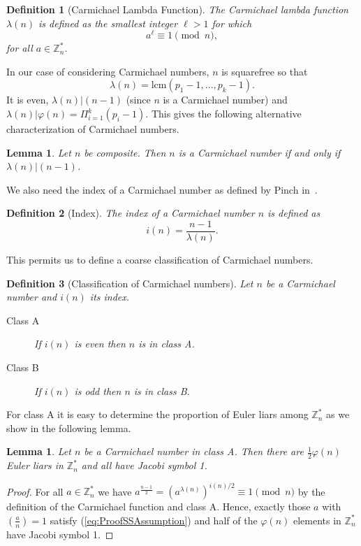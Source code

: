 \documentclass[runningheads]{amsart}
\newtheorem{lemma}[theorem]{Lemma}
\newtheorem{definition}{Definition}
\newcommand{\lcm}{\mathrm{lcm}}
\newcommand{\Z}{\mathbb{Z}}
\begin{document}
\begin{definition}[Carmichael Lambda Function]\label{def:car_lambda}
The Carmichael lambda function
$\lambda(n)$
is defined as the smallest integer
$\ell
>1$
for which
$$a^\ell
\equiv
1
\pmod
n,$$ for all $a
\in
\mathbb{Z}_n^*$.
\end{definition}
In our case of considering Carmichael numbers,
$n$ is squarefree so that
$$\lambda(n)
=
\lcm(p_1
-1,
...
,
p_k-1).$$
It is even,
$\lambda(n)|(n-1)$
(since $n$ is a Carmichael number) and
$\lambda(n)|
\varphi(n)
=
\Pi_{i=1}^k
(p_i
-1)$.
This gives the following alternative characterization of Carmichael numbers.

\begin{lemma}\label{lem:alter_carm}
Let $n$ be composite.
Then $n$ is a Carmichael number if and only if
$\lambda(n)|
(n-1)$.
\end{lemma}
\relax

We also need the index of a Carmichael number as defined by Pinch
in~\cite{pinch2006carmichaelnumbers1018}.
\begin{definition}[Index] \label{def:index}
The index of a Carmichael number $n$ is defined as $$ i(n) =
\frac{n-1}{\lambda(n)}.
$$
\end{definition}

This permits us to define a coarse classification of Carmichael numbers.

\begin{definition}[Classification of Carmichael numbers]
Let $n$ be a Carmichael number and $i(n)$ its index.
\begin{description}
\item[Class A] If $i(n)$ is even then $n$ is in class A.
\item[Class B] If $i(n)$ is odd then $n$ is in class B.
\end{description}
\end{definition}

For class A it is easy to determine the proportion of Euler liars among
$\Z_n^*$
as we show in the following lemma.

\begin{lemma}\label{lem:class_a}
Let $n$ be a Carmichael number in class A.
Then there are
$\frac12
\varphi(n)$
Euler liars in
$\Z_n^*$
and all have Jacobi symbol 1.
\end{lemma}
\begin{proof}
For all
$a\in
\Z_n^*$
we have
$a^{\frac{n-1}{2}}=\left(a^{\lambda(n)}\right)^{i(n)/2}\equiv
1
\pmod
n$ by the definition of the Carmichael function and class A.
Hence,
exactly those $a$ with
$\left(\frac{a}{n}\right)=1$
satisfy
(\ref{eq:ProofSSAssumption})
and half of the
$\varphi(n)$
elements in
$\Z_n^*$
have Jacobi symbol 1.
\end{proof}
\end{document}
